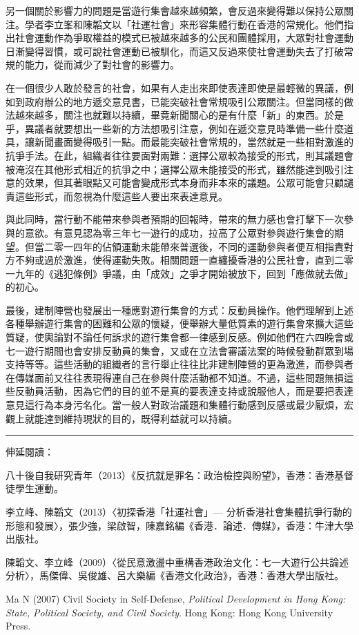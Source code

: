 另一個關於影響力的問題是當遊行集會越來越頻繁，會反過來變得難以保持公眾關注。學者李立峯和陳韜文以「社運社會」來形容集體行動在香港的常規化。他們指出社會運動作為爭取權益的模式已被越來越多的公民和團體採用，大眾對社會運動日漸變得習慣，或可說社會運動已被馴化，而這又反過來使社會運動失去了打破常規的能力，從而減少了對社會的影響力。

在一個很少人敢於發言的社會，如果有人走出來即使表達即使是最輕微的異議，例如到政府辦公的地方遞交意見書，已能突破社會常規吸引公眾關注。但當同樣的做法越來越多，關注也就難以持續，畢竟新聞關心的是有什麼「新」的東西。於是乎，異議者就要想出一些新的方法想吸引注意，例如在遞交意見時準備一些什麼道具，讓新聞畫面變得吸引一點。而最能突破社會常規的，當然就是一些相對激進的抗爭手法。在此，組織者往往要面對兩難：選擇公眾較為接受的形式，則其議題會被淹沒在其他形式相近的抗爭之中；選擇公眾未能接受的形式，雖然能達到吸引注意的效果，但其著眼點又可能會變成形式本身而非本來的議題。公眾可能會只顧譴責這些形式，而忽視為什麼這些人要出來表達意見。

與此同時，當行動不能帶來參與者預期的回報時，帶來的無力感也會打擊下一次參與的意欲。有意見認為零三年七一遊行的成功，拉高了公眾對參與遊行集會的期望。但當二零一四年的佔領運動未能帶來普選後，不同的運動參與者便互相指責對方不夠或過於激進，使得運動失敗。相關問題一直纏擾香港的公民社會，直到二零一九年的《逃犯條例》爭議，由「成效」之爭才開始被放下，回到「應做就去做」的初心。

最後，建制陣營也發展出一種應對遊行集會的方式：反動員操作。他們理解到上述各種舉辦遊行集會的困難和公眾的懷疑，便舉辦大量低質素的遊行集會來擴大這些質疑，使輿論對不論任何訴求的遊行集會都一律感到反感。例如他們在六四晚會或七一遊行期間也會安排反動員的集會，又或在立法會審議法案的時候發動群眾到場支持等等。這些活動的組織者的言行舉止往往比非建制陣營的更為激進，而參與者在傳媒面前又往往表現得連自己在參與什麼活動都不知道。不過，這些問題無損這些反動員活動，因為它們的目的並不是真的要表達支持或說服他人，而是要把表達意見這行為本身污名化。當一般人對政治議題和集體行動感到反感或最少厭煩，宏觀上就能達到維持現狀的目的，既得利益就可以持續。

\rule[-10pt]{15cm}{0.05em}

伸延閱讀：

八十後自我研究青年（2013）《反抗就是罪名：政治檢控與盼望》，香港：香港基督徒學生運動。

李立峰、陳韜文（2013）〈初探香港「社運社會」— 分析香港社會集體抗爭行動的形態和發展〉，張少強，梁啟智，陳嘉銘編《香港．論述．傳媒》，香港：牛津大學出版社。

陳韜文、李立峰（2009）〈從民意激盪中重構香港政治文化：七一大遊行公共論述分析〉，馬傑偉、吳俊雄、呂大樂編《香港文化政治》，香港：香港大學出版社。

Ma N (2007) Civil Society in Self-Defense, \textit{Political Development in Hong Kong: State, Political Society, and Civil Society}. Hong Kong: Hong Kong University Press.